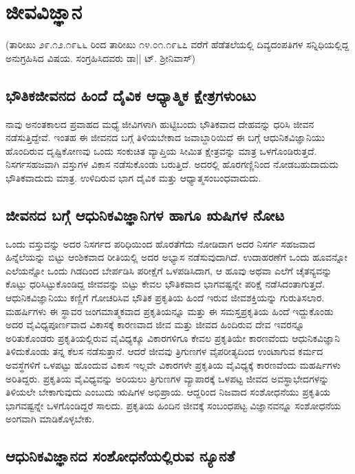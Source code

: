 \chapter{ಜೀವವಿಜ್ಞಾನ}

(ತಾರೀಖು ೨೯.೧೨.೧೯೬೬ ರಿಂದ ತಾರೀಖು ೧೪.೦೧.೧೯೬೭ ವರೆಗೆ ಹೆಡೆತಲೆಯಲ್ಲಿ ದಿವ್ಯದಂಪತಿಗಳ ಸನ್ನಿಧಿಯಲ್ಲಿದ್ದ ಅನುಗ್ರಹಿಸಿದ ವಿಷಯ. ಸಂಗ್ರಹಿಸಿದವರು ಡಾ|| ಟ್. ಶ್ರೀನಿವಾಸ್)

\section*{ಭೌತಿಕಜೀವನದ ಹಿಂದೆ ದೈವಿಕ ಆಧ್ಯಾತ್ಮಿಕ ಕ್ಷೇತ್ರಗಳುಂಟು}

ನಾವು ಅನಂತಕಾಲದ ಪ್ರವಾಹದ ಮಧ್ಯೆ ಜೀವಿಗಳಾಗಿ ಹುಟ್ಟಿಬಂದು ಭೌತಿಕವಾದ ದೇಹವನ್ನು ಧರಿಸಿ ಜೀವನ ನಡೆಸುತ್ತಿದ್ದೇವೆ. ಇಂತಹ ಈ ಜೀವನದ ಬಗ್ಗೆ ತಿಳಿಯಬೇಕಾದ ಜವಾಬ್ದಾರಿಯಿದೆ ಈ ಬಗ್ಗೆ ಆಧುನಿಕವಿಜ್ಞಾನಿಯು ಹೊಂದಿರುವ ದೃಷ್ಟಿಕೋಣವು ಒಂದು ಸಂಕುಚಿತ ವ್ಯಾಪ್ತಿಯ ಸೀಮಿತ ಕ್ಷೇತ್ರವನ್ನು ಮಾತ್ರ ಒಳಗೊಂಡಿರುತ್ತದೆ. ನಿಸರ್ಗಸಹಜವಾಗಿ ವಸ್ತುಗಳ ವಿಕಾಸ ನಡೆಸುಕೊಂಡು ಬರುತ್ತಿದೆ. ಅದರಲ್ಲಿ ಹೊರಗಣ್ಣಿನಿಂದ ನೋಡಬಹುದಾದುದು ಭೌತಿಕವಾದುದು ಮಾತ್ರ. ಉಳಿದಿರುವ ಭಾಗ ದೈವಿಕ ಮತ್ತು ಆಧ್ಯಾತ್ಮಸಂಬಂಧವಾದುದು.

\section*{ಜೀವನದ ಬಗ್ಗೆ ಆಧುನಿಕವಿಜ್ಞಾನಿಗಳ ಹಾಗೂ ಋಷಿಗಳ ನೋಟ}

ಒಂದು ವಸ್ತುವನ್ನು ಅದರ ನಿಸರ್ಗದ ಪರಿಧಿಯಿಂದ ಹೊರತೆಗೆದು ನೋಡಿದಾಗ ಅದರ ನಿಸರ್ಗ ಸಹಜವಾದ ಹಿನ್ನೆಲೆಯನ್ನು ಬಿಟ್ಟು ಆಂಶಿಕವಾದ ರೀತಿಯಲ್ಲಿ ಅದರ ಅಭ್ಯಾಸ ನಡೆಸುವುದಾಗಿದೆ. ಉದಾಹರಣೆಗೆ ಒಂದು ಹೂವನ್ನೋ ಎಲೆಯನ್ನೋ ಒಂದು ಗಿಡದಿಂದ ಬೇರ್ಪಡಿಸಿ ಪರೀಕ್ಷೆಗೆ ಒಳಪಡಿಸಿದಾಗ, ಆ ಹೂವು ಅಥವಾ ಎಲೆಗೆ ಚೈತನ್ಯವನ್ನು ಕೊಟ್ಟು ಧರಿಸಿಟ್ಟುಕೊಂಡಿದ್ದ ಜೀವವನ್ನು ಬಿಟ್ಟು ಕೇವಲ ಭೌತಿಕವಾದ ಭಾಗವಷ್ಟನ್ನೇ ಪರಿಕ್ಷೆ ನಡೆಸಿದಂತಾಗುತ್ತದೆ. ಆಧುನಿಕವಿಜ್ಞಾನಿಯು ಕಣ್ಣಿಗೆ ಗೋಚರಿಸಿವ ಭೌತಿಕ ಪ್ರಕೃತಿಯ ಹಿಂದೆ ಇರುವ ಜೀವಶಕ್ತಿಯನ್ನು ಗುರುತಿಸಲಾರ. ಮಹರ್ಷಿಗಳು ಈ ಸ್ಥಾವರ ಜಂಗಮಾತ್ಮಕವಾದ ಪ್ರಕೃತಿಯನ್ನೂ ಮತ್ತು ಈ ಸಮಸ್ತಪ್ರಕೃತಿಯ ಹಿಂದೆ ಇದ್ದುಕೊಂಡು ಅದರ ವೈವಿಧ್ಯಪೂರ್ಣವಾದ ವಿಕಾಸಕ್ಕೆ ಕಾರಣವಾದ ಜೀವ ಮತ್ತು ಜೀವದ ಹಿಂದಿರುವ ದೇವ ಇವರನ್ನೂ ಅರಿತುಕೊಂಡರು ಪ್ರಕೃತಿಯಲ್ಲಿರುವ ವೈವಿಧ್ಯಕ್ಕೂ ವಿಕಾರಗಳಿಗೂ ಕೇವಲ ಪ್ರಕೃತಿಯೇ ಕಾರಣವೆಂದು ಆಧುನಿಕವಿಜ್ಞಾನಿ ತಿಳಿದುಕೊಂಡು ತನ್ನ ಕೆಲಸ ನಡೆಸುತ್ತಾನೆ. ಆದರೆ ಜೀವವು ತ್ರಿಗುಣಗಳ ವೈಪರೀತ್ಯದಿಂದ ಉಂಟಾಗುವ ಕರ್ಮದ ಅವಸ್ಥೆಗಳಿಗೆ ಒಳಪಟ್ಟು ಹೊಂದುವ ವಿಕಾಸ ಇಲ್ಲವೇ ವಿಕಾರಗಳೇ ಪ್ರಕೃತಿಯ ವೈವಿಧ್ಯಕ್ಕೆ ಕಾರಣವೆಂದು ಮಹರ್ಷಿಗಳು ಅರಿತಿದ್ದರು. ಪ್ರಕೃತಿಯ ವೈವಿಧ್ಯವನ್ನು ಅರಿಯಲು ತ್ರಿಗುಣಗಳ ವ್ಯಾಪಾರಕ್ಕೆ ಒಳಪಟ್ಟ ಜೀವದ ಅವಸ್ಥಾಭೇದಗಳನ್ನು ತಿಳಿಯಲೇ ಬೇಕಾಗುವುದು ಎಂಬುದು ಋಷಿಗಳ ಅಭಿಪ್ರಾಯ. ಆದ್ದರಿಂದ ನಿಜವಾದ ಸಂಶೋಧನೆಯು ಪ್ರಕೃತಿಯ ಭಾಗವಷ್ಟನ್ನೇ ಒಳಗೊಂಡಿದ್ದರೆ ಸಾಲದು. ಪ್ರಕೃತಿಯ ಹಿಂದಿನ ಜೀವಕ್ಕೆ ಸಂಬಂಧಪಟ್ಟ ವಿಜ್ಞಾನವನ್ನೂ ಸಂಶೋಧನೆಯ ಅಂಗವಾಗಿ ಮಾಡಿಕೊಳ್ಳಬೇಕು.

\section*{ಆಧುನಿಕವಿಜ್ಞಾನದ ಸಂಶೋಧನೆಯಲ್ಲಿರುವ ನ್ಯೂನತೆ}


